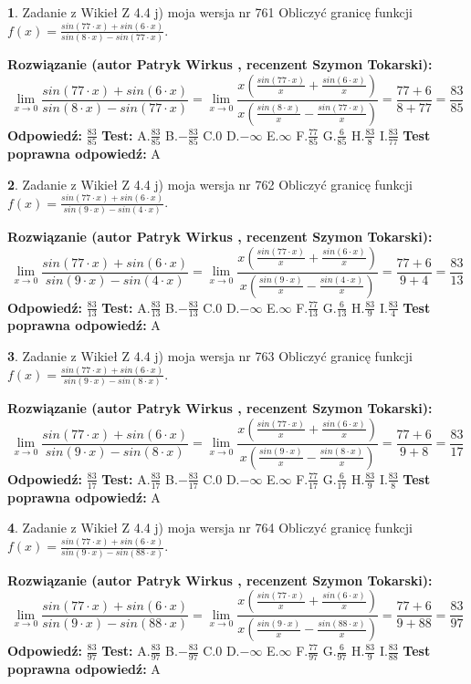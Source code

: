 \documentclass[12pt, a4paper]{article}
\theoremstyle{definition} %
\newtheorem{zad}{}
\newcommand{\zadStart}[1]{\begin{zad}#1\newline}
\newcommand{\zadStop}{\end{zad}}
\newcommand{\rozwStart}[2]{\noindent \textbf{Rozwiązanie (autor #1 , recenzent #2): }\newline}
\newcommand{\rozwStop}{\newline}
\newcommand{\odpStart}{\noindent \textbf{Odpowiedź:}\newline}
\newcommand{\odpStop}{\newline}
\newcommand{\testStart}{\noindent \textbf{Test:}\newline}
\newcommand{\testStop}{\newline}
\newcommand{\kluczStart}{\noindent \textbf{Test poprawna odpowiedź:}\newline}
\newcommand{\kluczStop}{\newline}
\begin{document}
\zadStart{Zadanie z Wikieł Z 4.4 j) moja wersja nr 761}
Obliczyć granicę funkcji $f(x)=\frac{sin(77\cdot x) +sin(6\cdot x)}{sin(8\cdot x) -sin(77\cdot x)}$.
\zadStop
\rozwStart{Patryk Wirkus}{Szymon Tokarski}
$$\lim\limits_{x\to 0}\frac{sin(77\cdot x) +sin(6\cdot x)}{sin(8\cdot x) -sin(77\cdot x)}=\lim\limits_{x\to 0}\frac{x(\frac{sin(77\cdot x)}{x}+\frac{sin(6\cdot x)}{x})}{x(\frac{sin(8\cdot x)}{x}-\frac{sin(77\cdot x)}{x})}=\frac{77+6}{8+77} = \frac{83}{85}$$
\rozwStop
\odpStart
$\frac{83}{85}$
\odpStop
\testStart
A.$\frac{83}{85}$
B.$-\frac{83}{85}$
C.$0$
D.$-\infty$
E.$\infty$
F.$\frac{77}{85}$
G.$\frac{6}{85}$
H.$\frac{83}{8}$
I.$\frac{83}{77}$
\testStop
\kluczStart
A
\kluczStop



\zadStart{Zadanie z Wikieł Z 4.4 j) moja wersja nr 762}
Obliczyć granicę funkcji $f(x)=\frac{sin(77\cdot x) +sin(6\cdot x)}{sin(9\cdot x) -sin(4\cdot x)}$.
\zadStop
\rozwStart{Patryk Wirkus}{Szymon Tokarski}
$$\lim\limits_{x\to 0}\frac{sin(77\cdot x) +sin(6\cdot x)}{sin(9\cdot x) -sin(4\cdot x)}=\lim\limits_{x\to 0}\frac{x(\frac{sin(77\cdot x)}{x}+\frac{sin(6\cdot x)}{x})}{x(\frac{sin(9\cdot x)}{x}-\frac{sin(4\cdot x)}{x})}=\frac{77+6}{9+4} = \frac{83}{13}$$
\rozwStop
\odpStart
$\frac{83}{13}$
\odpStop
\testStart
A.$\frac{83}{13}$
B.$-\frac{83}{13}$
C.$0$
D.$-\infty$
E.$\infty$
F.$\frac{77}{13}$
G.$\frac{6}{13}$
H.$\frac{83}{9}$
I.$\frac{83}{4}$
\testStop
\kluczStart
A
\kluczStop



\zadStart{Zadanie z Wikieł Z 4.4 j) moja wersja nr 763}
Obliczyć granicę funkcji $f(x)=\frac{sin(77\cdot x) +sin(6\cdot x)}{sin(9\cdot x) -sin(8\cdot x)}$.
\zadStop
\rozwStart{Patryk Wirkus}{Szymon Tokarski}
$$\lim\limits_{x\to 0}\frac{sin(77\cdot x) +sin(6\cdot x)}{sin(9\cdot x) -sin(8\cdot x)}=\lim\limits_{x\to 0}\frac{x(\frac{sin(77\cdot x)}{x}+\frac{sin(6\cdot x)}{x})}{x(\frac{sin(9\cdot x)}{x}-\frac{sin(8\cdot x)}{x})}=\frac{77+6}{9+8} = \frac{83}{17}$$
\rozwStop
\odpStart
$\frac{83}{17}$
\odpStop
\testStart
A.$\frac{83}{17}$
B.$-\frac{83}{17}$
C.$0$
D.$-\infty$
E.$\infty$
F.$\frac{77}{17}$
G.$\frac{6}{17}$
H.$\frac{83}{9}$
I.$\frac{83}{8}$
\testStop
\kluczStart
A
\kluczStop



\zadStart{Zadanie z Wikieł Z 4.4 j) moja wersja nr 764}
Obliczyć granicę funkcji $f(x)=\frac{sin(77\cdot x) +sin(6\cdot x)}{sin(9\cdot x) -sin(88\cdot x)}$.
\zadStop
\rozwStart{Patryk Wirkus}{Szymon Tokarski}
$$\lim\limits_{x\to 0}\frac{sin(77\cdot x) +sin(6\cdot x)}{sin(9\cdot x) -sin(88\cdot x)}=\lim\limits_{x\to 0}\frac{x(\frac{sin(77\cdot x)}{x}+\frac{sin(6\cdot x)}{x})}{x(\frac{sin(9\cdot x)}{x}-\frac{sin(88\cdot x)}{x})}=\frac{77+6}{9+88} = \frac{83}{97}$$
\rozwStop
\odpStart
$\frac{83}{97}$
\odpStop
\testStart
A.$\frac{83}{97}$
B.$-\frac{83}{97}$
C.$0$
D.$-\infty$
E.$\infty$
F.$\frac{77}{97}$
G.$\frac{6}{97}$
H.$\frac{83}{9}$
I.$\frac{83}{88}$
\testStop
\kluczStart
A
\kluczStop
\end{document}
